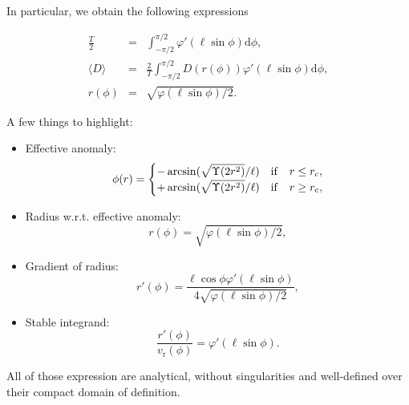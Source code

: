 \documentclass[11pt]{article}
\newcommand{\rr}{\mathrm{r}}
\newcommand{\rc}{\mathrm{c}}
\newcommand{\vr}{v_{\rr}}
\newcommand{\rd}{{\mathrm{d}}}
\newcommand{\rrc}{r_{\rc}}
\begin{document}
In particular, we obtain the following expressions

\begin{equation}
  \boxed{
    \begin{array}{ccl}
      \displaystyle{\frac{T}{2}} &=& \displaystyle{\int_{-\pi/2}^{\pi/2}\varphi'(\ell\sin\phi)\rd \phi},\\
      \displaystyle{\langle D\rangle} &=& \displaystyle{\frac{2}{T}\int_{-\pi/2}^{\pi/2}D(r(\phi))\varphi'(\ell\sin\phi)\rd \phi}, \\
      r(\phi) &=& \sqrt{\varphi(\ell\sin\phi)/2}.
    \end{array}
  }
  \label{eq:periodAndOAD}
 \end{equation}

A few things to highlight:
\begin{itemize}
\item Effective anomaly:
  \begin{equation}
  \phi(r)=\begin{cases}
\displaystyle{ -\arcsin(\sqrt{\Upsilon(2r^{2})}/\ell)} & {\rm{if}} \quad r\leq\rrc ,\\
\displaystyle{ +\arcsin(\sqrt{\Upsilon(2r^{2})}/\ell)} &{\rm{if}} \quad r\geq\rrc ,
  \end{cases}
  \label{eq:effective_anomaly}
  \end{equation}
  
\item Radius w.r.t. effective anomaly:
  \begin{equation}
 r(\phi)=\sqrt{\varphi(\ell\sin\phi)/2} ,
  \label{eq:r(effective_anomaly)}
  \end{equation}
  
\item Gradient of radius:
  \begin{equation}
 r'(\phi)=\frac{\ell\cos\phi\varphi'(\ell\sin\phi)}{4\sqrt{\varphi(\ell\sin\phi)/2}} ,
  \label{eq:Gradient_r(effective_anomaly)}
  \end{equation}
  
\item Stable integrand:
  \begin{equation}
 \frac{r'(\phi)}{\vr(\phi)}=\varphi'(\ell\sin\phi) .
  \label{eq:Gradient_r(effective_anomaly)_over_vr}
  \end{equation}
\end{itemize}

All of those expression are analytical, without singularities and well-defined over their compact domain of definition.
\end{document}
